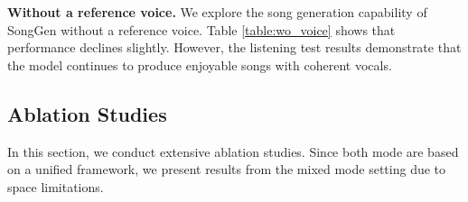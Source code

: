 \begin{table}[t]
\caption{Ablation results on different lyric integration methods.}
\vspace{-12pt}
\label{table:lyrics}
\begin{center}
\vspace{-20pt}
\end{center}
\end{table}


\noindent\textbf{Without a reference voice.}
We explore the song generation capability of SongGen without a reference voice. Table \ref{table:wo_voice} shows that performance declines slightly. However, the listening test results demonstrate that the model continues to produce enjoyable songs with coherent vocals. %









\subsection{Ablation Studies}
In this section, we conduct extensive ablation studies. Since both mode are based on a unified framework, we present results from the mixed mode setting due to space limitations.

